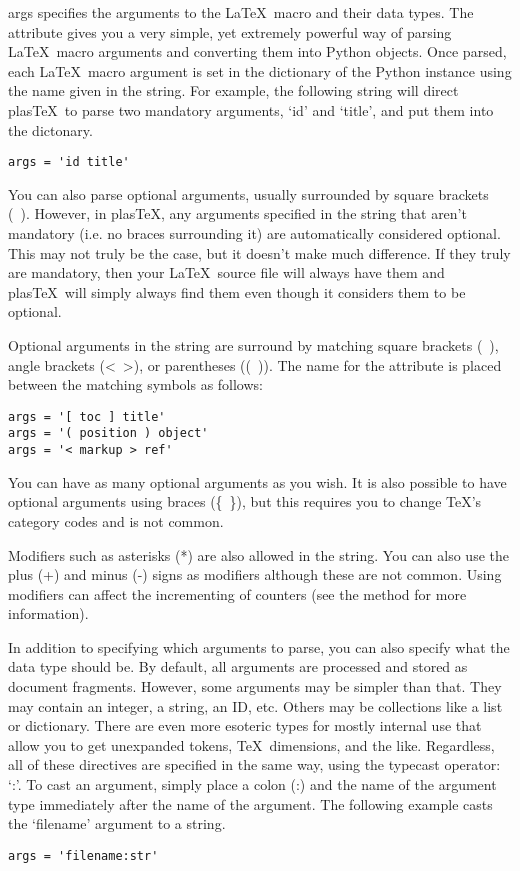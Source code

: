 \documentclass{manual}
\newcommand{\plasTeX}{plas\TeX}
\begin{document}
\begin{memberdesc}[Macro]{args}
specifies the arguments to the \LaTeX\ macro and their data types.  The
 attribute gives you a very simple, yet extremely powerful way
of parsing \LaTeX\ macro arguments and converting them into Python objects.
Once parsed, each \LaTeX\ macro argument is set in the 
dictionary of the Python instance using the name given in the 
string.  For example, the following  string will direct 
\plasTeX\ to parse two mandatory arguments, `id' and `title', and put them 
into the  dictonary.
\begin{verbatim}
args = 'id title'
\end{verbatim}

You can also parse optional arguments, usually surrounded by square brackets
(\lbrack~\rbrack).  However, in \plasTeX, any arguments specified in the 
string that aren't mandatory (i.e. no braces surrounding it) are automatically
considered optional.  This may not truly be the case, but it doesn't make
much difference.  If they truly are mandatory, then your \LaTeX\ source file will
always have them and \plasTeX\ will simply always find them even though it
considers them to be optional.  

Optional arguments in the  string are surround by matching
square brackets (\lbrack~\rbrack), angle brackets (<~>), or parentheses ((~)).
The name for the attribute is placed between the matching symbols as follows:
\begin{verbatim}
args = '[ toc ] title'
args = '( position ) object'
args = '< markup > ref'
\end{verbatim}
You can have as many optional arguments as you wish.  It is also possible to 
have optional arguments using braces (\{~\}), but this requires you
to change \TeX's category codes and is not common.

Modifiers such as asterisks (*) are also allowed in the  string.
You can also use the plus (+) and minus (-) signs as modifiers although these
are not common.  Using modifiers can affect the incrementing of counters (see
the  method for more information).

In addition to specifying which arguments to parse, you can also specify 
what the data type should be. 
By default, all arguments are processed and stored as document fragments.
However, some arguments may be simpler than that.  They may contain an integer,
a string, an ID, etc.  Others may be collections like a list or dictionary.
There are even more esoteric types for mostly internal use that allow you to
get unexpanded tokens, \TeX\ dimensions, and the like.  Regardless, all of 
these directives are specified in the same way, using the typecast operator:
`:'.  To cast an argument, simply place a colon (:) and the name of the 
argument type immediately after the name of the argument.  The following example
casts the `filename' argument to a string.
\begin{verbatim}
args = 'filename:str'
\end{verbatim}


\end{memberdesc}
\end{document}
